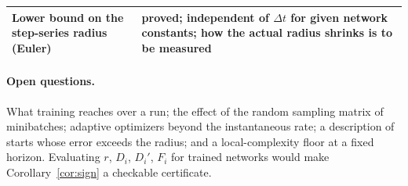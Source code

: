 \documentclass[11pt]{article}
\theoremstyle{definition}
\theoremstyle{remark}
\newcommand{\dt}{\Delta t}
\begin{document}
\begin{center}
\begin{tabular}{p{}p{}}
Lower bound on the step-series radius (Euler) & proved; independent of $\dt$ for given network constants; how the actual radius shrinks is to be measured \\
\bottomrule
\end{tabular}
\end{center}

\paragraph{Open questions.}
What training reaches over a run; the effect of the random sampling matrix of minibatches; adaptive optimizers beyond the instantaneous rate; a description of starts whose error exceeds the radius; and a local-complexity floor at a fixed horizon.
Evaluating $r$, $D_i$, $D_i'$, $F_i$ for trained networks would make Corollary~\ref{cor:sign} a checkable certificate.
\end{document}

